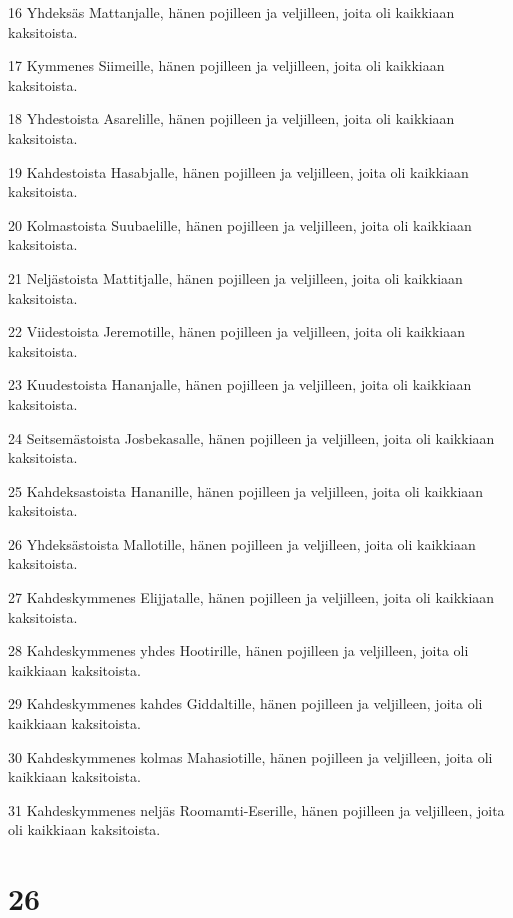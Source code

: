 \par 16 Yhdeksäs Mattanjalle, hänen pojilleen ja veljilleen, joita oli kaikkiaan kaksitoista.
\par 17 Kymmenes Siimeille, hänen pojilleen ja veljilleen, joita oli kaikkiaan kaksitoista.
\par 18 Yhdestoista Asarelille, hänen pojilleen ja veljilleen, joita oli kaikkiaan kaksitoista.
\par 19 Kahdestoista Hasabjalle, hänen pojilleen ja veljilleen, joita oli kaikkiaan kaksitoista.
\par 20 Kolmastoista Suubaelille, hänen pojilleen ja veljilleen, joita oli kaikkiaan kaksitoista.
\par 21 Neljästoista Mattitjalle, hänen pojilleen ja veljilleen, joita oli kaikkiaan kaksitoista.
\par 22 Viidestoista Jeremotille, hänen pojilleen ja veljilleen, joita oli kaikkiaan kaksitoista.
\par 23 Kuudestoista Hananjalle, hänen pojilleen ja veljilleen, joita oli kaikkiaan kaksitoista.
\par 24 Seitsemästoista Josbekasalle, hänen pojilleen ja veljilleen, joita oli kaikkiaan kaksitoista.
\par 25 Kahdeksastoista Hananille, hänen pojilleen ja veljilleen, joita oli kaikkiaan kaksitoista.
\par 26 Yhdeksästoista Mallotille, hänen pojilleen ja veljilleen, joita oli kaikkiaan kaksitoista.
\par 27 Kahdeskymmenes Elijjatalle, hänen pojilleen ja veljilleen, joita oli kaikkiaan kaksitoista.
\par 28 Kahdeskymmenes yhdes Hootirille, hänen pojilleen ja veljilleen, joita oli kaikkiaan kaksitoista.
\par 29 Kahdeskymmenes kahdes Giddaltille, hänen pojilleen ja veljilleen, joita oli kaikkiaan kaksitoista.
\par 30 Kahdeskymmenes kolmas Mahasiotille, hänen pojilleen ja veljilleen, joita oli kaikkiaan kaksitoista.
\par 31 Kahdeskymmenes neljäs Roomamti-Eserille, hänen pojilleen ja veljilleen, joita oli kaikkiaan kaksitoista.

\chapter{26}

